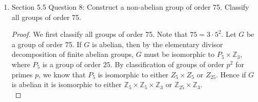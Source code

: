 \documentclass{article}
\begin{document}
\begin{enumerate}[label={\bf Q\arabic*:}]
\begin{proof}
      To show that $\Psi$ is bijective, we use a similar argument to
      construct a homomorphism \[\Theta:H\rtimes_{\varphi_2}K\rightarrow
      H\rtimes_{\varphi_1}K\] such that
      $\Psi\circ\Theta=\Theta\circ\Psi=\text{id}$: Like before, there
      exists $b\in\mathbb{N}$ such that
      \begin{align*}
        \varphi_2(g)  &= (\sigma\varphi_1(g)\sigma^{-1})^b. \\
      \end{align*}
      Then given any $k\in K$, we will have
      \begin{align*}
        \varphi_2(k)  &= \sigma\varphi_1(k)^b\sigma^{-1}. \\
      \end{align*}
      Then given any $k\in K$, we have
      \begin{align*}
        \varphi_1(k^{ab}) &= (\varphi_1(k)^b)^a & \\
                          &= (\sigma^{-1}\varphi_2(k)\sigma)^a & \\
                          &= \sigma^{-1}\varphi_2(k)^a\sigma & \\
                          &= \varphi_1(k), & \\
      \end{align*}
      so from injectivity of $\varphi_1$, we get $k^{ab}=k$ for all $k\in
      K$. Hence defining $\Theta$ to send $(h,k)$ to $(\sigma^{-1}(h),k^b)$
      will satisfy $\Psi\circ\Theta=\Theta\circ\Psi=\text{id}$, as
      required.
    \end{proof}

  \item Section 5.5 Question 8: Construct a non-abelian group of order 75.
    Classify all groups of order 75.

    \begin{proof}
      We first classify all groups of order 75. Note that $75=3\cdot5^2$.
      Let $G$ be a group of order 75. If $G$ is abelian, then by the
      elementary divisor decomposition of finite abelian groups, $G$ must
      be isomorphic to $P_5\times\mathbb{Z}_3$, where $P_5$ is a group of
      order $25$. By classification of groups of order $p^2$ for primes
      $p$, we know that $P_5$ is isomorphic to either $Z_5\times Z_5$ or
      $Z_{25}$. Hence if $G$ is abelian it is isomorphic to either
      $\mathbb{Z}_5\times\mathbb{Z}_5\times\mathbb{Z}_3$ or
      $\mathbb{Z}_{25}\times\mathbb{Z}_3$. \\


\end{proof}
\end{enumerate}
\end{document}

